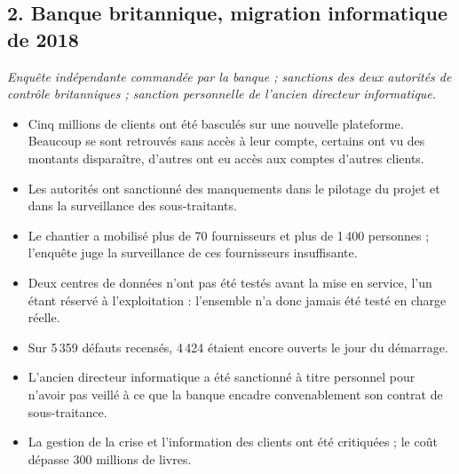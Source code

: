 \documentclass[11pt,a4paper]{article}
\begin{document}
\subsection*{2. Banque britannique, migration informatique de 2018}
\textit{Enquête indépendante commandée par la banque ; sanctions des deux autorités de contrôle
britanniques ; sanction personnelle de l'ancien directeur informatique.}
\begin{itemize}[itemsep=2pt]
\item Cinq millions de clients ont été basculés sur une nouvelle plateforme. Beaucoup se sont
      retrouvés sans accès à leur compte, certains ont vu des montants disparaître, d'autres ont
      eu accès aux comptes d'autres clients.
\item Les autorités ont sanctionné des manquements dans le pilotage du projet et dans la
      surveillance des sous-traitants.
\item Le chantier a mobilisé plus de 70 fournisseurs et plus de 1\,400 personnes ; l'enquête juge
      la surveillance de ces fournisseurs insuffisante.
\item Deux centres de données n'ont pas été testés avant la mise en service, l'un étant réservé à
      l'exploitation : l'ensemble n'a donc jamais été testé en charge réelle.
\item Sur 5\,359 défauts recensés, 4\,424 étaient encore ouverts le jour du démarrage.
\item L'ancien directeur informatique a été sanctionné à titre personnel pour n'avoir pas veillé
      à ce que la banque encadre convenablement son contrat de sous-traitance.
\item La gestion de la crise et l'information des clients ont été critiquées ; le coût dépasse
      300 millions de livres.
\end{itemize}
\end{document}
